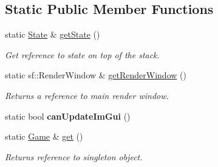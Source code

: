 \subsection*{Static Public Member Functions}
\begin{DoxyCompactItemize}
\item 
\hypertarget{classGame_aa742f626e4b8a5dac8677ef40263716c}{static \hyperlink{classState}{State} \& \hyperlink{classGame_aa742f626e4b8a5dac8677ef40263716c}{get\-State} ()}\label{classGame_aa742f626e4b8a5dac8677ef40263716c}

\begin{DoxyCompactList}\small\item\em Get reference to state on top of the stack. \end{DoxyCompactList}\item 
\hypertarget{classGame_ada9faa2a1f4e1453420adead02fd9865}{static sf\-::\-Render\-Window \& \hyperlink{classGame_ada9faa2a1f4e1453420adead02fd9865}{get\-Render\-Window} ()}\label{classGame_ada9faa2a1f4e1453420adead02fd9865}

\begin{DoxyCompactList}\small\item\em Returns a reference to main render window. \end{DoxyCompactList}\item 
\hypertarget{classGame_a8253d4688f27adcbad39d43f8354d7d3}{static bool {\bfseries can\-Update\-Im\-Gui} ()}\label{classGame_a8253d4688f27adcbad39d43f8354d7d3}

\item 
\hypertarget{classGame_ac69a0c5e25c7acb811f4a7b86a2ceb74}{static \hyperlink{classGame}{Game} \& \hyperlink{classGame_ac69a0c5e25c7acb811f4a7b86a2ceb74}{get} ()}\label{classGame_ac69a0c5e25c7acb811f4a7b86a2ceb74}

\begin{DoxyCompactList}\small\item\em Returns reference to singleton object. \end{DoxyCompactList}\end{DoxyCompactItemize}
